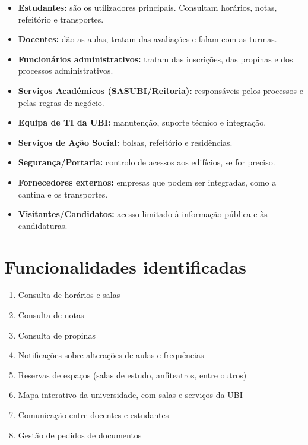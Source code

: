 \documentclass[11pt,a4paper]{article}
\begin{document}
\begin{itemize}
  \item \textbf{Estudantes:} são os utilizadores principais. Consultam horários, notas, refeitório e transportes.
  \item \textbf{Docentes:} dão as aulas, tratam das avaliações e falam com as turmas.
  \item \textbf{Funcionários administrativos:} tratam das inscrições, das propinas e dos processos administrativos.
  \item \textbf{Serviços Académicos (SASUBI/Reitoria):} responsáveis pelos processos e pelas regras de negócio.
  \item \textbf{Equipa de TI da UBI:} manutenção, suporte técnico e integração.
  \item \textbf{Serviços de Ação Social:} bolsas, refeitório e residências.
  \item \textbf{Segurança/Portaria:} controlo de acessos aos edifícios, se for preciso.
  \item \textbf{Fornecedores externos:} empresas que podem ser integradas, como a cantina e os transportes.
  \item \textbf{Visitantes/Candidatos:} acesso limitado à informação pública e às candidaturas.
\end{itemize}

\section{Funcionalidades identificadas}

\begin{enumerate}
  \item Consulta de horários e salas
  \item Consulta de notas
  \item Consulta de propinas
  \item Notificações sobre alterações de aulas e frequências
  \item Reservas de espaços (salas de estudo, anfiteatros, entre outros)
  \item Mapa interativo da universidade, com salas e serviços da UBI
  \item Comunicação entre docentes e estudantes
  \item Gestão de pedidos de documentos
\end{enumerate}

\end{document}
